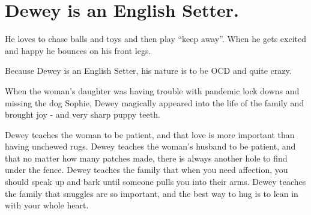 \documentclass[
  openany]{book}
\begin{document}
\hypertarget{dewey-is-an-english-setter.}{%
\section{Dewey is an English Setter.}\label{dewey-is-an-english-setter.}}

He loves to chase balls and toys and then play ``keep away''.
When he gets excited and happy he bounces on his front legs.

Because Dewey is an English Setter, his nature is to be OCD and quite crazy.

When the woman's daughter was having trouble with pandemic lock downs and missing the dog Sophie,
Dewey magically appeared into the life of the family and brought joy - and very sharp puppy teeth.

Dewey teaches the woman to be patient, and that love is more important than having unchewed rugs.
Dewey teaches the woman's husband to be patient, and that no matter how many patches made, there is always another hole to find under the fence.
Dewey teaches the family that when you need affection, you should speak up and bark until someone pulls you into their arms.
Dewey teaches the family that snuggles are so important, and the best way to hug is to lean in with your whole heart.
\end{document}
